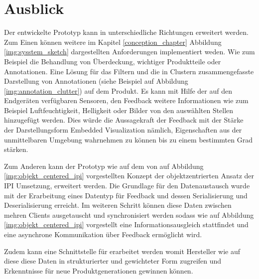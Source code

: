 \section{Ausblick}

Der entwickelte Prototyp kann in unterschiedliche Richtungen erweitert werden. Zum Einen können weitere im Kapitel \ref{conception_chapter} Abbildung \ref{img:sysstem_sketch} dargestellten Anforderungen implementiert 
weden. Wie zum Beispiel die Behandlung von Überdeckung, wichtiger Produktteile oder Annotationen. Eine Lösung für das Filtern und die in Clustern zusammengefasste Darstellung  von Annotationen (siehe Beispiel auf Abbildung \ref{img:annotation_clutter}) auf dem Produkt. Es kann mit Hilfe der 
auf den Endgeräten verfügbaren Sensoren, den Feedback weitere Informationen wie zum Beispiel Luftfeuchtigkeit, Helligkeit oder Bilder von den auswählten Stellen hinzugefügt werden. Dies würde die Aussagekraft der Feedback mit der Stärke der Darstellungsform Embedded Visualization nämlich, Eigenschaften aus der unmittelbaren Umgebung wahrnehmen zu können bis zu einem bestimmten Grad stärken. 

Zum Anderen kann der Prototyp wie auf dem von \citeauthor{Kirschner2012} auf Abbildung \ref{img:objekt_centered_ipi} vorgestellten Konzept der objektzentrierten Ansatz der IPI Umsetzung, erweitert werden.
Die Grundlage für den Datenaustausch wurde mit der Erarbeitung eines Datentyp für Feedback und dessen Serialisierung und Deserialisierung erreicht. Im weiteren Schritt können diese Daten zwischen mehren
Clients ausgetauscht und synchronisiert werden sodass wie auf Abbildung \ref{img:objekt_centered_ipi} vorgestellt eine Informationsausgleich stattfindet und eine asynchrone Kommunikation über Feedback ermöglicht wird. 

Zudem kann eine Schnittstelle für erarbeitet werden womit Hersteller wie auf diese diese Daten in strukturierter und gewichteter Form zugreifen und Erkenntnisse für neue Produktgenerationen gewinnen können.  




